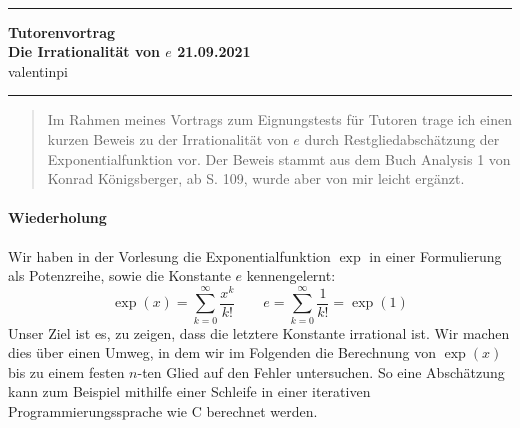 \documentclass[10pt]{article}
\theoremstyle{definition}
\theoremstyle{remark}
\newcommand{\Authors}{valentinpi}
\begin{document}
\vspace*{-12ex}
\phantom{}\\
\noindent\rule{\textwidth}{0.1pt}
\large \textbf{Tutorenvortrag} \vspace*{0.25cm}\\
\normalsize \textbf{Die Irrationalität von \(e\) \hfill 21.09.2021}\\
\Authors\\
\noindent\rule{\textwidth}{0.1pt}

\begin{abstract}
    \noindent Im Rahmen meines Vortrags zum Eignungstests für Tutoren trage ich einen kurzen Beweis zu der Irrationalität von \(e\) durch Restgliedabschätzung der Exponentialfunktion vor. Der Beweis stammt aus dem Buch Analysis 1 von Konrad Königsberger, ab S. 109, wurde aber von mir leicht ergänzt.
\end{abstract}

\paragraph{Wiederholung} Wir haben in der Vorlesung die Exponentialfunktion \(\exp\) in einer Formulierung als Potenzreihe, sowie die Konstante \(e\) kennengelernt:
\[
    \exp(x) = \sum_{k=0}^\infty \frac{x^k}{k!} \qquad e = \sum_{k=0}^\infty \frac{1}{k!} = \exp(1)
\]
 Unser Ziel ist es, zu zeigen, dass die letztere Konstante irrational ist. Wir machen dies über einen Umweg, in dem wir im Folgenden die Berechnung von \(\exp(x)\) bis zu einem festen \(n\)-ten Glied auf den Fehler untersuchen. So eine Abschätzung kann zum Beispiel mithilfe einer Schleife in einer iterativen Programmierungssprache wie C berechnet werden.
 
\end{document}

